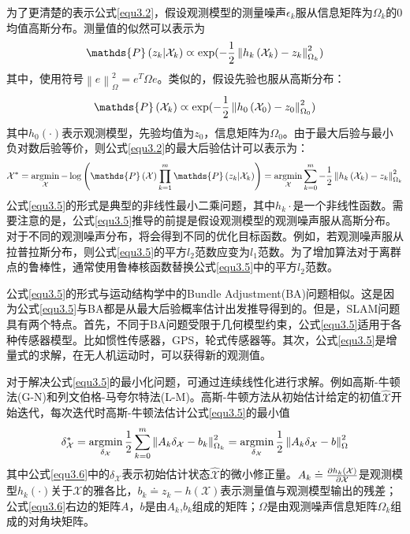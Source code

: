 为了更清楚的表示公式\eqref{equ3.2}，假设观测模型的测量噪声$\epsilon_k$服从信息矩阵为$\Omega_k$的0均值高斯分布。测量值的似然可以表示为
\begin{equation}
\label{equ3.3}
\mathds{P}\left(z_k \vert \mathcal{X}_k  \right) \varpropto \exp ( -{1 \over 2} \left\| h_k\left( \mathcal{X}_k \right) - z_k \right\|_{\Omega_k}^2 )
\end{equation}
其中，使用符号$\left\| e \right\|_{\Omega}^2 = e^T \Omega e$。类似的，假设先验也服从高斯分布：
\begin{equation}
\label{equ3.4}
\mathds{P}\left( \mathcal{X}_k  \right) \varpropto \exp ( -{1 \over 2} \left\| h_0\left( \mathcal{X}_0 \right) - z_0 \right\|_{\Omega_0}^2 )
\end{equation}
其中$h_0(\cdot)$表示观测模型，先验均值为$z_0$，信息矩阵为$\Omega_0$。由于最大后验与最小负对数后验等价，则公式\eqref{equ3.2}的最大后验估计可以表示为：
\begin{equation}
\label{equ3.5}
\mathcal{X}^* 
=
\argmin \limits_{\mathcal{X}} - \log \left( \mathds{P}\left(\mathcal{X}\right) \prod \limits_{k=1}^{m} \mathds{P}\left(z_k \vert \mathcal{X}_k  \right) \right)
=
\argmin \limits_{\mathcal{X}} \sum \limits_{k=0}^{m} -{1 \over 2} \left\| h_k\left( \mathcal{X}_k \right) - z_k \right\|_{\Omega_k}^2
\end{equation}
公式\eqref{equ3.5}的形式是典型的非线性最小二乘问题，其中$h_k{\cdot}$是一个非线性函数。需要注意的是，公式\eqref{equ3.5}推导的前提是假设观测模型的观测噪声服从高斯分布。对于不同的观测噪声分布，将会得到不同的优化目标函数。例如，若观测噪声服从拉普拉斯分布，则公式\eqref{equ3.5}的平方$l_2$范数应变为$l_1$范数。为了增加算法对于离群点的鲁棒性，通常使用鲁棒核函数替换公式\eqref{equ3.5}中的平方$l_2$范数。

公式\eqref{equ3.5}的形式与运动结构学中的Bundle Adjustment(BA)问题相似。这是因为公式\eqref{equ3.5}与BA都是从最大后验概率估计出发推导得到的。但是，SLAM问题具有两个特点。首先，不同于BA问题受限于几何模型约束，公式\eqref{equ3.5}适用于各种传感器模型。比如惯性传感器，GPS，轮式传感器等。其次，公式\eqref{equ3.5}是增量式的求解，在无人机运动时，可以获得新的观测值。

对于解决公式\eqref{equ3.5}的最小化问题，可通过连续线性化进行求解。例如高斯-牛顿法(G-N)和列文伯格-马夸尔特法(L-M)。高斯-牛顿方法从初始估计给定的初值$\hat{\mathcal{X}}$开始迭代，每次迭代时高斯-牛顿法估计公式\eqref{equ3.5}的最小值
\begin{equation}
\label{equ3.6}
\delta_\mathcal{X}^* 
=
\operatorname*{argmin} \limits_{\delta_\mathcal{X}} {1 \over 2} \sum \limits_{k=0}^{m} \left\| A_k\delta_\mathcal{X}-b_k \right\|_{\Omega_k}^2
=
\operatorname*{argmin} \limits_{\delta_\mathcal{X}} {1 \over 2} \left\| A_k\delta_\mathcal{X}-b \right\|_{\Omega}^2
\end{equation}
其中公式\eqref{equ3.6}中的$\delta_\mathcal{X}$表示初始估计状态$\hat{\mathcal{X}}$的微小修正量。$A_k \doteq {\partial h_k(\mathcal{X}) \over \partial \mathcal{X}} $是观测模型$h_k(\cdot)$关于$\mathcal{X}$的雅各比，$b_k \doteq z_k-h(\mathcal{X})$表示测量值与观测模型输出的残差；公式\eqref{equ3.6}右边的矩阵$A$，$b$是由$A_k$,$b_k$组成的矩阵；$\Omega$是由观测噪声信息矩阵$\Omega_k$组成的对角块矩阵。

